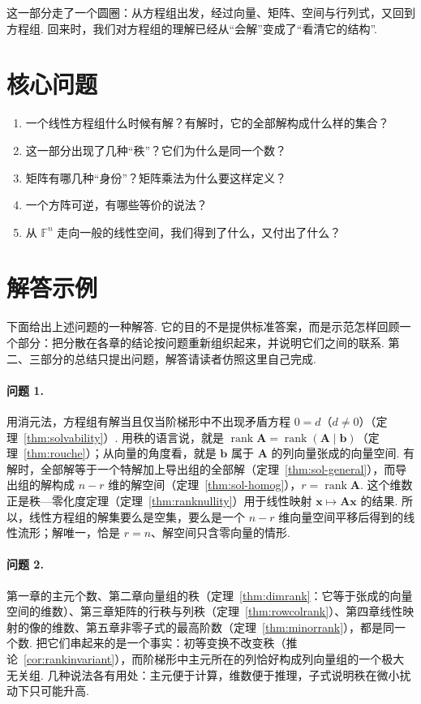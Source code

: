 \documentclass[lang=cn,10.5pt,scheme=chinese,toc=twocol,section,chinesefont=nofont,
twoside,citestyle=gb7714-2015,bibstyle=gb7714-2015]{elegantbook}
\newcommand{\vv}[1]{\boldsymbol{#1}}
\numberwithin{equation}{section}   %
\newcommand{\rk}{\operatorname{rank}}       %
\begin{document}
这一部分走了一个圆圈：从方程组出发，经过向量、矩阵、空间与行列式，又回到方程组. 回来时，我们对方程组的理解已经从“会解”变成了“看清它的结构”.

\section*{核心问题}

\begin{enumerate}
  \item 一个线性方程组什么时候有解？有解时，它的全部解构成什么样的集合？
  \item 这一部分出现了几种“秩”？它们为什么是同一个数？
  \item 矩阵有哪几种“身份”？矩阵乘法为什么要这样定义？
  \item 一个方阵可逆，有哪些等价的说法？
  \item 从 $\mathbb{F}^n$ 走向一般的线性空间，我们得到了什么，又付出了什么？
\end{enumerate}

\section*{解答示例}

下面给出上述问题的一种解答. 它的目的不是提供标准答案，而是示范怎样回顾一个部分：把分散在各章的结论按问题重新组织起来，并说明它们之间的联系. 第二、三部分的总结只提出问题，解答请读者仿照这里自己完成.

\paragraph*{问题 1.} 用消元法，方程组有解当且仅当阶梯形中不出现矛盾方程 $0=d$（$d\ne0$）（定理~\ref{thm:solvability}）. 用秩的语言说，就是 $\rk\vv A=\rk(\vv A\mid\vv b)$（定理~\ref{thm:rouche}）；从向量的角度看，就是 $\vv b$ 属于 $\vv A$ 的列向量张成的向量空间. 有解时，全部解等于一个特解加上导出组的全部解（定理~\ref{thm:sol-general}），而导出组的解构成 $n-r$ 维的解空间（定理~\ref{thm:sol-homog}），$r=\rk\vv A$. 这个维数正是秩—零化度定理（定理~\ref{thm:ranknullity}）用于线性映射 $\vv x\mapsto\vv{Ax}$ 的结果. 所以，线性方程组的解集要么是空集，要么是一个 $n-r$ 维向量空间平移后得到的线性流形；解唯一，恰是 $r=n$、解空间只含零向量的情形.

\paragraph*{问题 2.} 第一章的主元个数、第二章向量组的秩（定理~\ref{thm:dimrank}：它等于张成的向量空间的维数）、第三章矩阵的行秩与列秩（定理~\ref{thm:rowcolrank}）、第四章线性映射的像的维数、第五章非零子式的最高阶数（定理~\ref{thm:minorrank}），都是同一个数. 把它们串起来的是一个事实：初等变换不改变秩（推论~\ref{cor:rankinvariant}），而阶梯形中主元所在的列恰好构成列向量组的一个极大无关组. 几种说法各有用处：主元便于计算，维数便于推理，子式说明秩在微小扰动下只可能升高.
\end{document}
